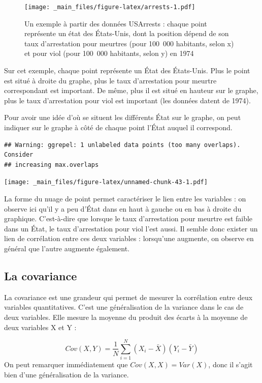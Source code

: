\documentclass[
  french,
]{book}
\begin{document}
\begin{figure}
\centering
\texttt{[image: \_main\_files/figure-latex/arrests-1.pdf]}
\caption{\label{fig:arrests}Un exemple à partir des données USArrests : chaque point représente un état des États-Unis, dont la position dépend de son taux d'arrestation pour meurtres (pour 100~000 habitants, selon x) et pour viol (pour 100~000 habitants, selon y) en 1974}
\end{figure}

Sur cet exemple, chaque point représente un État des États-Unis. Plus le
point est situé à droite du graphe, plus le taux d'arrestation pour
meurtre correspondant est important. De même, plus il est situé en hauteur sur le graphe, plus le taux d'arrestation pour viol est important (les données
datent de 1974).

Pour avoir une idée d'où se situent les différents État sur le graphe,
on peut indiquer sur le graphe à côté de chaque point l'État auquel il
correspond.

\begin{verbatim}
## Warning: ggrepel: 1 unlabeled data points (too many overlaps). Consider
## increasing max.overlaps
\end{verbatim}

\texttt{[image: \_main\_files/figure-latex/unnamed-chunk-43-1.pdf]}

La forme du nuage de point permet caractériser le lien entre les
variables : on observe ici qu'il y a peu d'État dans en haut à gauche ou
en bas à droite du graphique. C'est-à-dire que lorsque le taux
d'arrestation pour meurtre est faible dans un État, le taux
d'arrestation pour viol l'est aussi. Il semble donc exister un lien de
corrélation entre ces deux variables : lorsqu'une augmente, on observe
en général que l'autre augmente également.

\hypertarget{la-covariance}{%
\subsection{La covariance}\label{la-covariance}}

La covariance est une grandeur qui permet de mesurer la corrélation
entre deux variables quantitatives. C'est une généralisation de la
variance dans le cas de deux variables. Elle mesure la moyenne du
produit des écarts à la moyenne de deux variables X et Y :

\[ Cov(X, Y) = \frac{1}{N} \sum^N_{i = 1}(X_i - \bar{X})(Y_i - \bar{Y})\]
On peut remarquer immédiatement que \(Cov(X,X) = Var(X)\), donc il s'agit
bien d'une généralisation de la variance.
\end{document}

